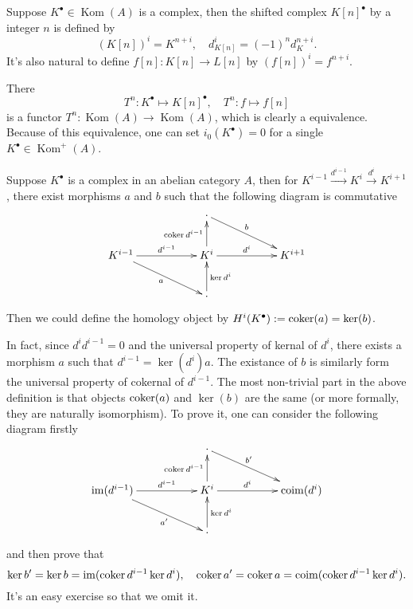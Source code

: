 \begin{definition}
	Suppose $K^\bullet \in \operatorname{Kom}(A)$ is a complex, then 
	the shifted complex $K[n]^\bullet$ by a integer $n$
	is defined by
	\[
		(K[n])^i=K^{n+i},\quad d_{K[n]}^i=(-1)^n d_K^{n+i}.
	\]
	It's also natural to define $f[n]:K[n]\to L[n]$ by 
	$(f[n])^i=f^{n+i}$.
\end{definition}

There 
\[
	T^n:K^\bullet \mapsto K[n]^\bullet, \quad 
	T^n:f\mapsto f[n]
\]
is a functor $T^n:\operatorname{Kom}(A)\to \operatorname{Kom}(A)$, which
is clearly a equivalence. Because of this equivalence, one can set 
$i_0(K^\bullet)=0$ for a single $K^\bullet \in \operatorname{Kom}^+(A)$.

\begin{definition}
Suppose $K^\bullet$ is a complex in an abelian category $A$, then for 
$K^{i-1}\xrightarrow{d^{i-1}}K^i\xrightarrow{d^i}K^{i+1}$, there exist
morphisms $a$ and $b$ such that the following diagram is commutative
\[
	\begin{xy}
		\xymatrix{
			&&\cdot \ar[rrd]^-{b}&&\\
			K^{i-1} \ar[rr]^-{d^{i-1}} \ar[rrd]_{a}&& K^i \ar[rr]^-{d^i}\ar[u]^-{\coker d^{i-1}}&&K^{i+1}\\
			&&\cdot \ar[u]_-{\ker d^i}&&
		}
	\end{xy}
\]
Then we could define the homology object by 
$H^i(K^\bullet):=\operatorname{coker}(a)=\ker(b)$.
\end{definition}

In fact, since $d^id^{i-1}=0$ and the universal property of kernal of $d^i$,
there exists a morphism $a$ such that $d^{i-1}=\ker (d^i)a$. The existance
of $b$ is similarly form the universal property of cokernal of $d^{i-1}$.
The most non-trivial part in the above definition is that objects
$\operatorname{coker}(a)$ and $\ker(b)$ are the same (or more formally, they are naturally
isomorphism). To prove it, one can consider the following diagram firstly
\[
	\begin{xy}
		\xymatrix{
		&&\cdot \ar[rrd]^-{b'}&&\\
		\im(d^{i-1}) \ar[rr]^-{d^{i-1}} \ar[rrd]_-{a'}&& K^i \ar[rr]^-{d^i}\ar[u]^-{\coker d^{i-1}}&&\operatorname{coim}(d^{i}) \\
		&&\cdot \ar[u]_-{\ker d^i}&&
		}
	\end{xy}
\]
and then prove that 
\[
	\ker b'=\ker b= \operatorname{im} (\operatorname{coker} d^{i-1}\ker d^i),\quad  \operatorname{coker} a'=\operatorname{coker} a
	=\operatorname{coim} (\operatorname{coker} d^{i-1}\ker d^i).
\]
It's an easy exercise so that we omit it.

